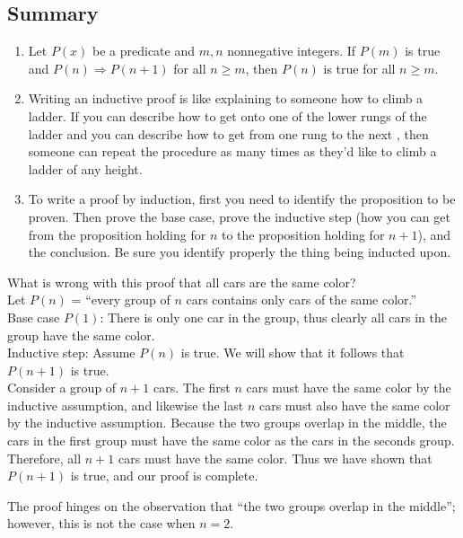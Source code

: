 \documentclass[solution, letterpaper]{cs20}
\begin{document}
	\subsection{Summary}
	    \begin{enumerate}
        \item Let $P(x)$ be a predicate and $m, n$ nonnegative integers.  If $P(m)$ is true and $P(n) \Rightarrow P(n+1)$ for all $n \ge m$, then $P(n)$ is true for all $n \ge m$.
        \item Writing an inductive proof is like explaining to someone how to climb a ladder. If you can describe how to get onto one of the lower rungs of the ladder and you can describe how to get from one rung to the next , then someone can repeat the procedure as many times as they'd like to climb a ladder of any height.
        \item To write a proof by induction, first you need to identify the proposition to be proven.  Then prove the base case, prove the inductive step (how you can get from the proposition holding for $n$ to the proposition holding for $n+1$), and the conclusion.  Be sure you identify properly the thing being inducted upon.
        \end{enumerate}

        \problem{}{}

        What is wrong with this proof that all cars are the same color?\\

        Let $P(n)$ = ``every group of $n$ cars contains only cars of the same color.''\\
        Base case $P(1)$: There is only one car in the group, thus clearly all cars in the group have the same color. \\
        Inductive step: Assume $P(n)$ is true. We will show that it follows that $P(n+1)$ is true. \\
        Consider a group of $n+1$ cars. The first $n$ cars must have the same color by the inductive assumption, and likewise the last $n$ cars must also have the same color by the inductive assumption. Because the two groups overlap in the middle, the cars in the first group must have the same color as the cars in the seconds group. Therefore, all $n+1$ cars must have the same color. Thus we have shown that $P(n+1)$ is true, and our proof is complete.

        \begin{solution}

        The proof hinges on the observation that ``the two groups overlap in the middle''; however, this is not the case when $n = 2$.

        \end{solution}
\end{document}
